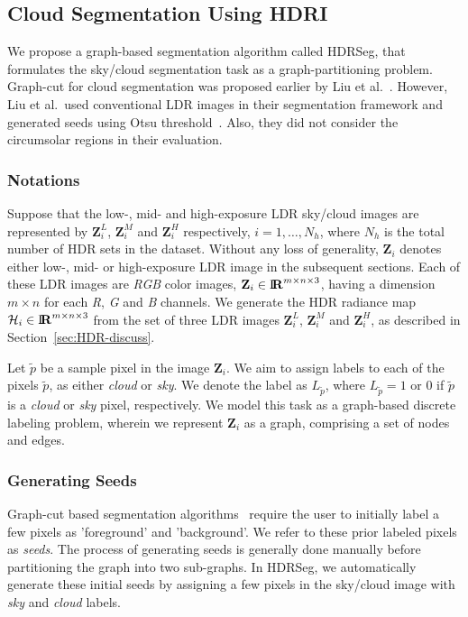 \subsection{Cloud Segmentation Using HDRI}
We propose a graph-based segmentation algorithm called HDRSeg, that formulates the sky/cloud segmentation task as a graph-partitioning problem. Graph-cut for cloud segmentation was proposed earlier by Liu et al.~\cite{Liu_AGC}. However, Liu et al.\ used conventional LDR images in their segmentation framework and generated seeds using Otsu threshold~\cite{Otsu79}. Also, they did not consider the circumsolar regions in their evaluation.

\subsubsection{Notations}
Suppose that the low-, mid- and high-exposure LDR sky/cloud images are represented by $\mathbf{Z}_i^{L}$, $\mathbf{Z}_i^{M}$ and $\mathbf{Z}_i^{H}$ respectively, $i=1,\ldots,N_h$, where $N_h$ is the total number of HDR sets in the dataset. Without any loss of generality, $\mathbf{Z}_i$ denotes either low-, mid- or high-exposure LDR image in the subsequent sections. Each of these LDR images are \emph{RGB} color images, $\mathbf{Z}_i \in {\rm I\!\mathbf{R}}^{m \times n \times 3}$, having a dimension $m \times n$ for each \emph{R}, \emph{G} and \emph{B} channels. We generate the HDR radiance map $\mathcal{H}_i \in {\rm I\!\mathbf{R}}^{m \times n \times 3}$ from the set of three LDR images $\mathbf{Z}_i^{L}$, $\mathbf{Z}_i^{M}$ and $\mathbf{Z}_i^{H}$, as described in Section~\ref{sec:HDR-discuss}. 

Let $\tilde{p}$ be a sample pixel in the image $\mathbf{Z}_i$. We aim to assign labels to each of the pixels $\tilde{p}$, as either \emph{cloud} or \emph{sky}. We denote the label as $L_{\tilde{p}}$, where $L_{\tilde{p}} = 1 \mbox{ or } 0$ if $\tilde{p}$ is a \emph{cloud} or \emph{sky} pixel, respectively. We model this task as a graph-based discrete labeling problem, wherein we represent $\mathbf{Z}_i$ as a graph, comprising a set of nodes and edges.

\subsubsection{Generating Seeds}
Graph-cut based segmentation algorithms~\cite{Boykov_ICCV} require the user to initially label a few pixels as 'foreground' and 'background'.   We refer to these prior labeled pixels as \emph{seeds}. The process of generating seeds is generally done manually before partitioning the graph into two sub-graphs. In HDRSeg, we automatically generate these initial seeds by assigning a few pixels in the sky/cloud image with \emph{sky} and \emph{cloud} labels. 

